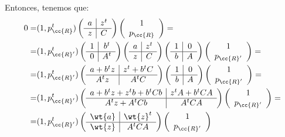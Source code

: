 Entonces, tenemos que:
\begin{equation*}\begin{split}
    0=&(1, p_{\cc{R}}^t)\left(\begin{array}{c|c}
        a & z^t \\ \hline
        z & C
    \end{array}\right)\left(\begin{array}{c}
        1 \\ p_{\cc{R}}
    \end{array}\right)
    =\\=& (1, p_{\cc{R}'}^t)\left(\begin{array}{c|c}
        1 & b^t \\ \hline
        0 & A^t
    \end{array}\right)\left(\begin{array}{c|c}
        a & z^t \\ \hline
        z & C
    \end{array}\right)\left(\begin{array}{c|c}
        1 & 0 \\ \hline
        b & A
    \end{array}\right)\left(\begin{array}{c}
        1 \\ p_{\cc{R}'}
    \end{array}\right) =\\
    =& (1, p_{\cc{R}'}^t)\left(\begin{array}{c|c}
        a+b^tz & z^t+b^tC \\ \hline
        A^tz & A^tC
    \end{array}\right)\left(\begin{array}{c|c}
        1 & 0 \\ \hline
        b & A
    \end{array}\right)\left(\begin{array}{c}
        1 \\ p_{\cc{R}'}
    \end{array}\right)
    =\\
    =& (1, p_{\cc{R}'}^t)\left(\begin{array}{c|c}
        a+b^tz + z^tb+b^tCb & z^tA + b^tCA\\ \hline
        A^tz+A^tCb & A^tCA
    \end{array}\right)\left(\begin{array}{c}
        1 \\ p_{\cc{R}'}
    \end{array}\right)=\\
    =& (1, p_{\cc{R}'}^t)\left(\begin{array}{c|c}
        \wt{a} & \wt{z}^t\\ \hline
        \wt{z} & A^tCA
    \end{array}\right)\left(\begin{array}{c}
        1 \\ p_{\cc{R}'}
    \end{array}\right)
\end{split}\end{equation*}


